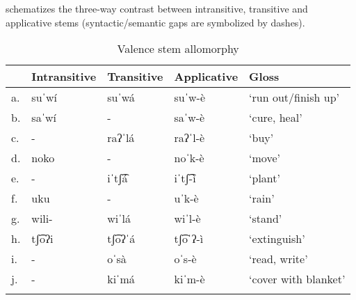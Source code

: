                         \label{ex: valence stem allomorphy 3c}
    \z
\z

 schematizes the three-way contrast between intransitive, transitive and applicative stems (syntactic/semantic gaps are symbolized by dashes).

\begin{table}
\caption{Valence stem allomorphy}
\label{tab:valence-stem-allomorphy}

\begin{tabularx}{\textwidth}{Xllll}
\lsptoprule
& \textbf{Intransitive}  &   \textbf{Transitive} &  \textbf{Applicative } &     \textbf{Gloss}\\
\midrule
a.& suˈwí    & suˈwá     &     suˈw-è &                  ‘run out/finish up’\\
b.& saˈwí          &   - &                 saˈw-è &                  ‘cure, heal’\\
c.&   - &               raʔˈlá      &       raʔˈl-è &                   ‘buy'\\
d.&   noko      &      - &                noˈk-è      &            ‘move’\\
e.&    - &              iˈtʃ͡á      &        iˈtʃ͡-ì  &                   ‘plant'\\
f.&   uku  &             - &                uˈk-è     &             ‘rain'\\
g.&  wili-  &             wiˈlá  &         wiˈl-è      &            ‘stand’\\
h.&  tʃ͡oʔi  &             tʃ͡oʔˈá &           tʃ͡oˈʔ-ì &                   ‘extinguish’\\
i.&   -     &               oˈsà &           oˈs-è     &               ‘read, write’\\
j.&   -      &              kiˈmá  &         kiˈm-è     &            ‘cover with blanket’\\
\lspbottomrule
\end{tabularx}
\end{table}

